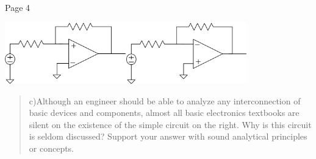 \documentclass[10pt,a4paper]{article}
\begin{document}
Page 4

\includegraphics[width=2.06944in,height=1.05556in]{vertopal_3376d9a0695b4078a59040ba2f51c60d/media/image8.png}\includegraphics[width=2.05556in,height=1.05556in]{vertopal_3376d9a0695b4078a59040ba2f51c60d/media/image9.png}

\begin{quote}
c)Although an engineer should be able to analyze any interconnection of
basic devices and components, almost all basic electronics textbooks are
silent on the existence of the simple circuit on the right. Why is this
circuit is seldom discussed? Support your answer with sound analytical
principles or concepts.
\end{quote}
\end{document}
